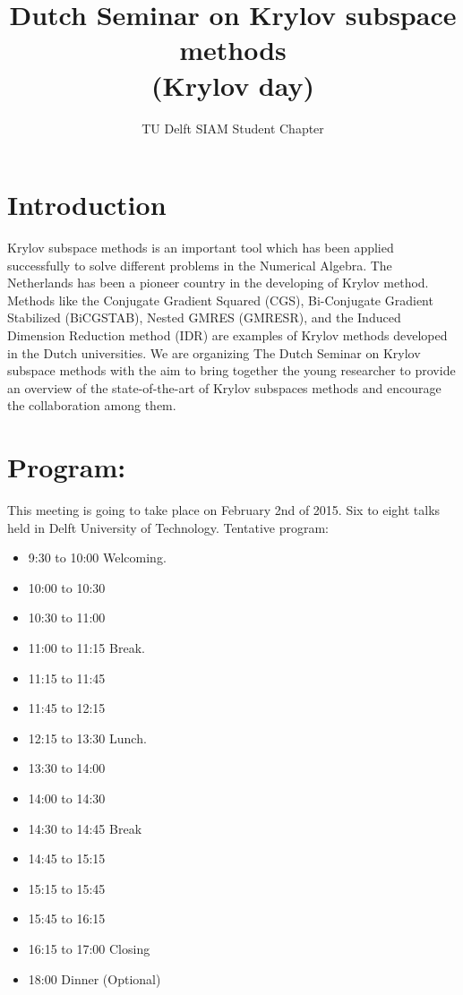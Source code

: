 \documentclass{article}
\title{Dutch Seminar on Krylov subspace methods \\(Krylov day)}
\author{TU Delft SIAM Student Chapter}
\begin{document}
\maketitle
\section{Introduction}
Krylov subspace methods is an important tool which has been applied successfully to solve different problems 
in the Numerical Algebra. The Netherlands has been a pioneer country in the developing of Krylov method.
Methods like the Conjugate Gradient Squared (CGS), Bi-Conjugate Gradient Stabilized (BiCGSTAB), Nested GMRES (GMRESR), and the Induced Dimension Reduction method (IDR)  
are examples of Krylov methods developed in the Dutch universities. 
We are organizing The Dutch Seminar on Krylov subspace methods with the aim 
to bring together the young researcher to provide an
overview of the state-of-the-art of Krylov subspaces methods and encourage 
the collaboration among them.
\newpage
\section{Program:}
This meeting is going to take place on February 2nd of 2015. Six to eight talks held in Delft University of Technology. 
Tentative program:
\begin{itemize}
\item 9:30 to 10:00 Welcoming. 
\item 10:00 to 10:30 
\item 10:30 to 11:00 
\item 11:00 to 11:15 Break.
\item 11:15 to 11:45
\item 11:45 to 12:15
\item 12:15 to 13:30 Lunch.
\item 13:30 to 14:00 
\item 14:00 to 14:30 
\item 14:30 to 14:45 Break 
\item 14:45 to 15:15 
\item 15:15 to 15:45 
\item 15:45 to 16:15 
\item 16:15 to 17:00 Closing
\item 18:00 Dinner (Optional) 
\end{itemize}
\end{document}
